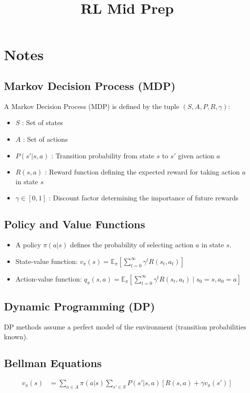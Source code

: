 \documentclass[addpoints]{exam}
\title{RL Mid Prep}
\author{}
\begin{document}
\maketitle

\section*{Notes}

\subsection*{Markov Decision Process (MDP)}
A Markov Decision Process (MDP) is defined by the tuple $ (S, A, P, R, \gamma) $:
\begin{itemize}
    \item $S$ : Set of states
    \item $A$ : Set of actions
    \item $P(s' | s, a)$ : Transition probability from state $s$ to $s'$ given action $a$
    \item $R(s, a)$ : Reward function defining the expected reward for taking action $a$ in state $s$
    \item $\gamma \in [0,1]$ : Discount factor determining the importance of future rewards
\end{itemize}

\subsection*{Policy and Value Functions}
\begin{itemize}
    \item A policy $\pi(a|s)$ defines the probability of selecting action $a$ in state $s$.
    \item State-value function: $v_\pi(s) = \mathbb{E}_\pi \left[ \sum_{t=0}^{\infty} \gamma^t R(s_t, a_t) \right]$
    \item Action-value function: $q_\pi(s, a) = \mathbb{E}_\pi \left[ \sum_{t=0}^{\infty} \gamma^t R(s_t, a_t) \mid s_0 = s, a_0 = a \right]$
\end{itemize}

\subsection*{Dynamic Programming (DP)}
DP methods assume a perfect model of the environment (transition probabilities known).
\subsection*{Bellman Equations}
\begin{align*}
    v_\pi(s) &= \sum_{a \in A} \pi(a|s) \sum_{s' \in S} P(s' | s, a) \left[ R(s, a) + \gamma v_\pi(s') \right]
\end{align*}
\end{document}

